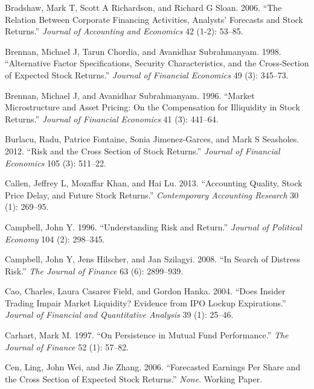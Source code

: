 \documentclass[
  letterpaper,
  DIV=11,
  numbers=noendperiod]{scrreprt}
\newlength{\cslhangindent}
\newlength{\cslentryspacingunit} %
\newenvironment{CSLReferences}[2] %
 {%
  \setlength{\parindent}{0pt}
  \ifodd #1
  \let\oldpar\par
  \def\par{\hangindent=\cslhangindent\oldpar}
  \fi
  \setlength{\parskip}{#2\cslentryspacingunit}
 }%
 {}
\begin{document}
\begin{CSLReferences}{1}{0}
\leavevmode{}%
Bradshaw, Mark T, Scott A Richardson, and Richard G Sloan. 2006. {``The
Relation Between Corporate Financing Activities, Analysts' Forecasts and
Stock Returns.''} \emph{Journal of Accounting and Economics} 42 (1-2):
53--85.

\leavevmode{}%
Brennan, Michael J, Tarun Chordia, and Avanidhar Subrahmanyam. 1998.
{``Alternative Factor Specifications, Security Characteristics, and the
Cross-Section of Expected Stock Returns.''} \emph{Journal of Financial
Economics} 49 (3): 345--73.

\leavevmode{}%
Brennan, Michael J, and Avanidhar Subrahmanyam. 1996. {``Market
Microstructure and Asset Pricing: On the Compensation for Illiquidity in
Stock Returns.''} \emph{Journal of Financial Economics} 41 (3): 441--64.

\leavevmode{}%
Burlacu, Radu, Patrice Fontaine, Sonia Jimenez-Garces, and Mark S
Seasholes. 2012. {``Risk and the Cross Section of Stock Returns.''}
\emph{Journal of Financial Economics} 105 (3): 511--22.

\leavevmode{}%
Callen, Jeffrey L, Mozaffar Khan, and Hai Lu. 2013. {``Accounting
Quality, Stock Price Delay, and Future Stock Returns.''}
\emph{Contemporary Accounting Research} 30 (1): 269--95.

\leavevmode{}%
Campbell, John Y. 1996. {``Understanding Risk and Return.''}
\emph{Journal of Political Economy} 104 (2): 298--345.

\leavevmode{}%
Campbell, John Y, Jens Hilscher, and Jan Szilagyi. 2008. {``In Search of
Distress Risk.''} \emph{The Journal of Finance} 63 (6): 2899--939.

\leavevmode{}%
Cao, Charles, Laura Casares Field, and Gordon Hanka. 2004. {``Does
Insider Trading Impair Market Liquidity? Evidence from IPO Lockup
Expirations.''} \emph{Journal of Financial and Quantitative Analysis} 39
(1): 25--46.

\leavevmode{}%
Carhart, Mark M. 1997. {``On Persistence in Mutual Fund Performance.''}
\emph{The Journal of Finance} 52 (1): 57--82.

\leavevmode{}%
Cen, Ling, John Wei, and Jie Zhang. 2006. {``Forecasted Earnings Per
Share and the Cross Section of Expected Stock Returns.''} \emph{None}.
Working Paper.


\end{CSLReferences}
\end{document}
